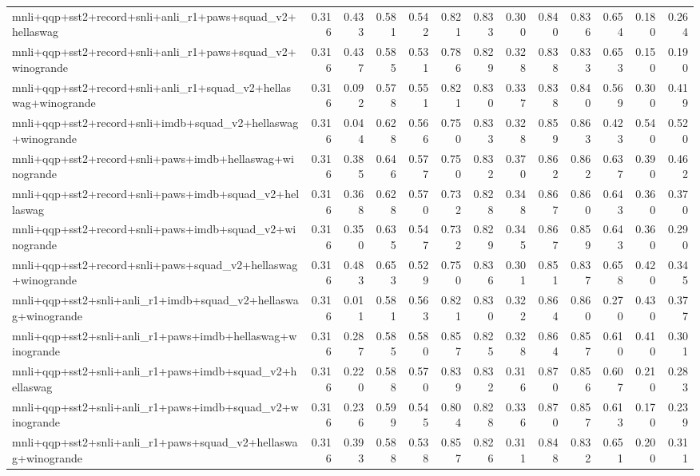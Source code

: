 \begin{table}[t]
\begin{tabular}{lrrrrrrrrrrrr}
    mnli+qqp+sst2+record+snli+anli\_r1+paws+squad\_v2+hellaswag & 0.316 & 0.433 & 0.581 & 0.542 & 0.821 & 0.833 & 0.300 & 0.840 & 0.836 & 0.654 & 0.180 & 0.264 \\
    mnli+qqp+sst2+record+snli+anli\_r1+paws+squad\_v2+winogrande & 0.316 & 0.437 & 0.585 & 0.531 & 0.786 & 0.829 & 0.328 & 0.838 & 0.833 & 0.653 & 0.150 & 0.190 \\
    mnli+qqp+sst2+record+snli+anli\_r1+squad\_v2+hellaswag+winogrande & 0.316 & 0.092 & 0.578 & 0.551 & 0.821 & 0.830 & 0.337 & 0.838 & 0.840 & 0.569 & 0.300 & 0.419 \\
    mnli+qqp+sst2+record+snli+imdb+squad\_v2+hellaswag+winogrande & 0.316 & 0.044 & 0.628 & 0.566 & 0.750 & 0.833 & 0.328 & 0.859 & 0.863 & 0.423 & 0.540 & 0.520 \\
    mnli+qqp+sst2+record+snli+paws+imdb+hellaswag+winogrande & 0.316 & 0.385 & 0.646 & 0.577 & 0.750 & 0.832 & 0.370 & 0.862 & 0.862 & 0.637 & 0.390 & 0.462 \\
    mnli+qqp+sst2+record+snli+paws+imdb+squad\_v2+hellaswag & 0.316 & 0.368 & 0.628 & 0.570 & 0.732 & 0.828 & 0.348 & 0.867 & 0.860 & 0.643 & 0.360 & 0.370 \\
    mnli+qqp+sst2+record+snli+paws+imdb+squad\_v2+winogrande & 0.316 & 0.350 & 0.635 & 0.547 & 0.732 & 0.829 & 0.345 & 0.867 & 0.859 & 0.643 & 0.360 & 0.290 \\
    mnli+qqp+sst2+record+snli+paws+squad\_v2+hellaswag+winogrande & 0.316 & 0.483 & 0.653 & 0.529 & 0.750 & 0.836 & 0.301 & 0.851 & 0.837 & 0.658 & 0.420 & 0.345 \\
    mnli+qqp+sst2+snli+anli\_r1+imdb+squad\_v2+hellaswag+winogrande & 0.316 & 0.011 & 0.581 & 0.563 & 0.821 & 0.830 & 0.322 & 0.864 & 0.860 & 0.270 & 0.430 & 0.377 \\
    mnli+qqp+sst2+snli+anli\_r1+paws+imdb+hellaswag+winogrande & 0.316 & 0.287 & 0.585 & 0.580 & 0.857 & 0.825 & 0.328 & 0.864 & 0.857 & 0.610 & 0.410 & 0.301 \\
    mnli+qqp+sst2+snli+anli\_r1+paws+imdb+squad\_v2+hellaswag & 0.316 & 0.220 & 0.588 & 0.570 & 0.839 & 0.832 & 0.316 & 0.870 & 0.856 & 0.607 & 0.210 & 0.283 \\
    mnli+qqp+sst2+snli+anli\_r1+paws+imdb+squad\_v2+winogrande & 0.316 & 0.236 & 0.599 & 0.545 & 0.804 & 0.828 & 0.336 & 0.870 & 0.857 & 0.613 & 0.170 & 0.239 \\
    mnli+qqp+sst2+snli+anli\_r1+paws+squad\_v2+hellaswag+winogrande & 0.316 & 0.393 & 0.588 & 0.538 & 0.857 & 0.826 & 0.311 & 0.848 & 0.832 & 0.651 & 0.200 & 0.311 \\

\end{tabular}
\end{table}
